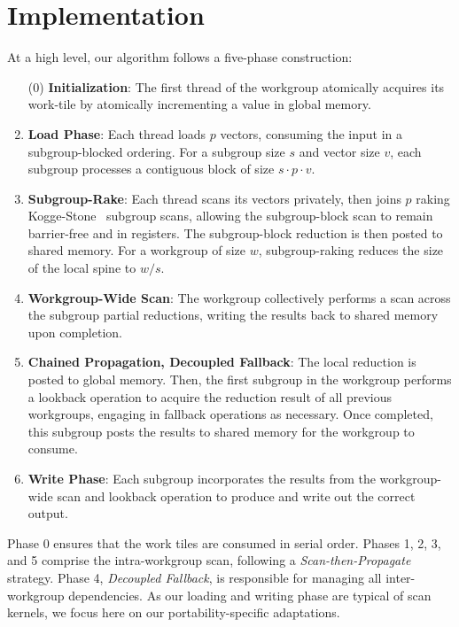 \documentclass[sigconf,screen]{acmart}
\begin{document}
\section{Implementation}
At a high level, our algorithm follows a five-phase construction:
\begin{enumerate}
  \item[(0)] \textbf {Initialization}: The first thread of the workgroup atomically acquires its work-tile by atomically incrementing a value in global memory.
  \item \textbf{Load Phase}: Each thread loads $p$ vectors, consuming the input in a subgroup-blocked ordering. For a subgroup size $s$ and vector size $v$, each subgroup processes a contiguous block of size $s \cdot p \cdot v$.
  \item \textbf{Subgroup-Rake}: Each thread scans its vectors privately, then joins $p$ raking Kogge-Stone~\cite{5009159} subgroup scans,
        allowing the subgroup-block scan to remain barrier-free and in registers. The subgroup-block reduction is then posted to shared memory. For a workgroup of size $w$, subgroup-raking reduces the size of the local spine to $w/s$.
  \item \textbf{Workgroup-Wide Scan}: The workgroup collectively performs a scan across the subgroup partial reductions, writing the results back to shared memory upon completion.
  \item \textbf{Chained Propagation, Decoupled Fallback}: The local reduction is posted to global memory. Then, the first subgroup in the workgroup performs a lookback operation to acquire the reduction result of all previous workgroups, engaging in fallback operations as necessary. Once completed, this subgroup posts the results to shared memory for the workgroup to consume.
  \item \textbf{Write Phase}: Each subgroup incorporates the results from the workgroup-wide scan and lookback operation to produce and write out the correct output.
\end{enumerate}
Phase 0 ensures that the work tiles are consumed in serial order. Phases 1, 2, 3, and 5 comprise the intra-workgroup scan, following a \emph{Scan-then-Propagate} strategy. Phase 4, \emph{Decoupled Fallback}, is responsible for managing all inter-workgroup dependencies. As our loading and writing phase are typical of scan kernels, we focus here on our portability-specific adaptations.
\end{document}
